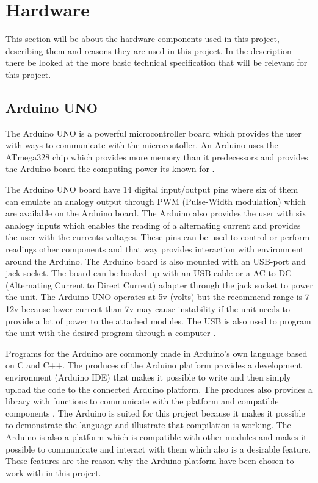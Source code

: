 \section{Hardware}
This section will be about the hardware components used in this project, describing them and reasons they are used in this project. In the description there be looked at the more basic technical specification that will be relevant for this project.
\subsection{Arduino UNO}
The Arduino UNO is a powerful microcontroller board which provides the user with ways to communicate with the microcontoller. An Arduino uses the ATmega328 chip which provides more memory than it predecessors and provides the Arduino board the computing power its known for \citep{ArduinoUno}.

The Arduino UNO board have 14 digital input/output pins where six of them can emulate an analogy output through PWM (Pulse-Width modulation) which are available on the Arduino board. The Arduino also provides the user with six analogy inputs which enables the reading of a alternating current and provides the user with the currents voltages. These pins can be used to control or perform readings other components and that way provides interaction with environment around the Arduino.
The Arduino board is also mounted with an USB-port and jack socket. The board can be hooked up with an USB cable or a AC-to-DC (Alternating Current to Direct Current) adapter through the jack socket to power the unit. The Arduino UNO operates at 5v (volts) but the recommend range is 7-12v because lower current than 7v may cause instability if the unit needs to provide a lot of power to the attached modules. The USB is also used to program the unit with the desired program through a computer \citep{ArduinoUno}.

Programs for the Arduino are commonly made in Arduino's own language based on C and C++. The produces of the Arduino platform provides a development environment (Arduino IDE) that makes it possible to write and then simply upload the code to the connected Arduino platform. The produces also provides a library with functions to communicate with the platform and compatible components \citep{ArduinoLanguage}.
The Arduino is suited for this project because it makes it possible to demonstrate the language and illustrate that compilation is working. The Arduino is also a platform which is compatible with other modules and makes it possible to communicate and interact with them which also is a desirable feature. These features are the reason why the Arduino platform have been chosen to work with in this project.

